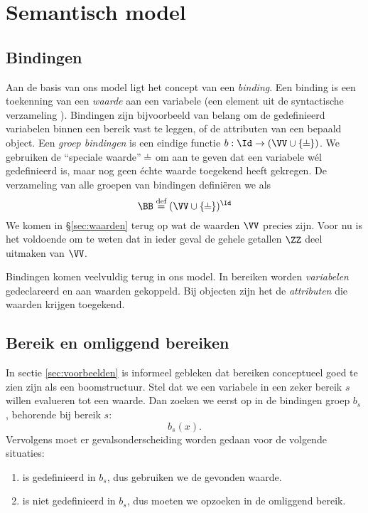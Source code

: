 \chapter{Semantisch model}

\section{Bindingen}\label{sec:bindingen}

Aan de basis van ons model ligt het concept van een \emph{binding}. Een binding is een toekenning van een \emph{waarde} aan een variabele (een element uit de syntactische verzameling \Id). Bindingen zijn bijvoorbeeld van belang om de gedefinieerd variabelen binnen een bereik vast te leggen, of de attributen van een bepaald object. Een \emph{groep bindingen} is een eindige functie $b : \Id \to (\VV \cup \{\nil\})$. We gebruiken de ``speciale waarde'' $\nil$ om aan te geven dat een variabele wél gedefinieerd is, maar nog geen échte waarde toegekend heeft gekregen. De verzameling van alle groepen van bindingen definiëren we als
\begin{equation*}
  \BB \DEF (\VV \cup \{\nil\})^\Id
\end{equation*}
We komen in §\ref{sec:waarden} terug op wat de waarden $\VV$ precies zijn. Voor nu is het voldoende om te weten dat in ieder geval de gehele getallen $\ZZ$ deel uitmaken van $\VV$.

Bindingen komen veelvuldig terug in ons model. In bereiken worden \emph{variabelen} gedeclareerd en aan waarden gekoppeld. Bij objecten zijn het de \emph{attributen} die waarden krijgen toegekend.

\section{Bereik en omliggend bereiken}
\label{sec:bereiken}

In sectie \ref{sec:voorbeelden} is informeel gebleken dat bereiken conceptueel goed te zien zijn als een boomstructuur. Stel dat we een variabele  in een zeker bereik $s$ willen evalueren tot een waarde. Dan zoeken we  eerst op in de bindingen groep $b_s$, behorende bij bereik $s$:
%
\begin{equation*}
  b_s(x).
\end{equation*}
%
Vervolgens moet er gevalsonderscheiding worden gedaan voor de volgende situaties:

\begin{enumerate}
  \item {} is gedefinieerd in $b_s$, dus gebruiken we de gevonden waarde.
  \item {} is niet gedefinieerd in $b_s$, dus moeten we  opzoeken in de omliggend bereik.
\end{enumerate}

